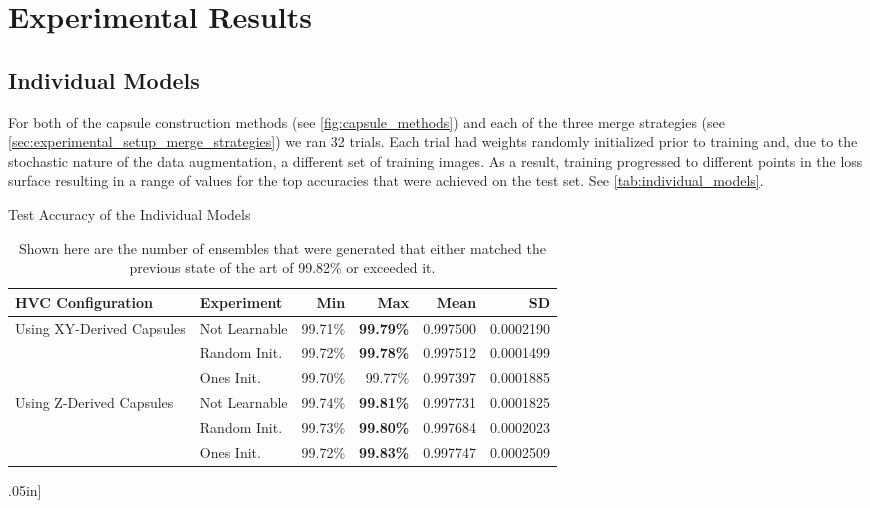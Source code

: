 \documentclass{article}
\begin{document}
\section{Experimental Results}\label{sec:experimental_results}

\subsection{Individual Models}

For both of the capsule construction methods (see \autoref{fig:capsule_methods}) and each of the three merge strategies (see \autoref{sec:experimental_setup_merge_strategies}) we ran 32 trials.  Each trial had weights randomly initialized prior to training and, due to the stochastic nature of the data augmentation, a different set of training images.  As a result, training progressed to different points in the loss surface resulting in a range of values for the top accuracies that were achieved on the test set.  See \autoref{tab:individual_models}.

\begin{table}[!ht]
  \centering
  \begin{minipage}{\textwidth}
    \caption{Test Accuracy of the Individual Models}
    \begin{tabularx}{\textwidth}{@{}Xlrrrr@{}}
      \toprule
	      HVC Configuration & Experiment & Min & Max & Mean & SD \\
      \midrule
        \multirow{3}{*}{\begin{minipage}{2.5in}Using XY-Derived Capsules\end{minipage}}
	      & Not Learnable & 99.71\% & \textbf{99.79\%} & 0.997500 & 0.0002190 \\
	      & Random Init. & 99.72\% & \textbf{99.78\%} & 0.997512 & 0.0001499 \\
	      & Ones Init. & 99.70\% & 99.77\% & 0.997397 & 0.0001885 \\
      \midrule
        \multirow{3}{*}{\begin{minipage}{2.15in}Using Z-Derived Capsules\end{minipage}}
	      & Not Learnable & 99.74\% & \textbf{99.81\%} & 0.997731 & 0.0001825 \\
	      & Random Init. & 99.73\% & \textbf{99.80\%} & 0.997684 & 0.0002023 \\
	      & Ones Init. & 99.72\% & \textbf{99.83\%} & 0.997747 & 0.0002509 \\
      \bottomrule
    \end{tabularx}\0.05in]\label{tab:ensembles}
    \captionsetup{justification=justified,singlelinecheck=false}
    \caption*{Shown here are the number of ensembles that were generated that either matched the previous state of the art of 99.82\% or exceeded it.}
  \end{minipage}
\end{table}
\end{document}
